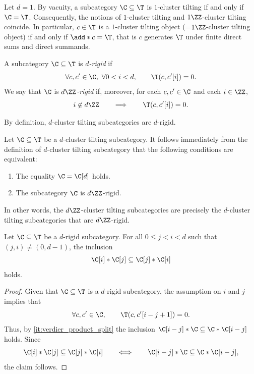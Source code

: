 \documentclass[a4paper]{amsart}
\begin{document}
\begin{remark}
  Let $d=1$. By vacuity, a subcategory $\C\subseteq\T$ is $1$-cluster tilting if
  and only if $\C=\T$. Consequently, the notions of $1$-cluster tilting and
  $1\ZZ$-cluster tilting coincide. In particular, $c\in\T$ is a $1$-cluster
  tilting object (=$1\ZZ$-cluster tilting object) if and only if $\add*{c}=\T$,
  that is $c$ generates $\T$ under finite direct sums and direct summands.
\end{remark}

\begin{definition}
  A subcategory $\C\subseteq\T$ is \emph{$d$-rigid} if
  \[
    \forall c,c'\in\C,\ \forall 0<i<d,\qquad \T(c,c'[i])=0.
  \]
  We say that $\C$ is \emph{$d\ZZ$-rigid} if, moreover, for each $c,c'\in\C$ and
  each $i\in\ZZ$,
  \[
    i\not\in d\ZZ\qquad\Longrightarrow\qquad\T(c,c'[i])=0.
  \]
\end{definition}

\begin{remark}
  By definition, $d$-cluster tilting subcategories are $d$-rigid.
\end{remark}

\begin{remark}
  \label{rmk:dZ}
  Let $\C\subseteq\T$ be a $d$-cluster tilting subcategory. It follows
  immediately from the definition of $d$-cluster tilting subcategory that the
  following conditions are equivalent:
  \begin{enumerate}
  \item The equality $\C=\C[d]$ holds.
  \item The subcategory $\C$ is $d\ZZ$-rigid.
  \end{enumerate}
  In other words, the $d\ZZ$-cluster tilting subcategories are precisely the
  $d$-cluster tilting subcategories that are $d\ZZ$-rigid.
\end{remark}

\begin{lemma}
  \label{lemma:commutativity_lemma}
  Let $\C\subseteq\T$ be a $d$-rigid subcategory. For all $0\leq j<i<d$ such
  that $(j,i)\neq(0,d-1)$, the inclusion
  \[
    \C[i]*\C[j]\subseteq\C[j]*\C[i]
  \]
  holds.
\end{lemma}
\begin{proof}
  Given that $\C\subseteq\T$ is a $d$-rigid subcategory, the assumption on $i$
  and $j$ implies that
  \[
    \forall c,c'\in\C,\qquad\T(c,c'[i-j+1])=0.
  \]
  Thus, by \eqref{it:verdier_product_split} the
  inclusion $\C[i-j]*\C\subseteq\C*\C[i-j]$ holds. Since
  \[
    \C[i]*\C[j]\subseteq\C[j]*\C[i]\qquad\Longleftrightarrow\qquad\C[i-j]*\C\subseteq\C*\C[i-j],
  \]
  the claim follows.
\end{proof}
\end{document}
